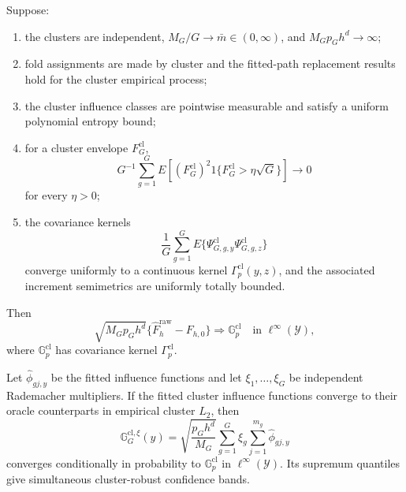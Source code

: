 \begin{proposition}
\label{prop:cluster-bootstrap}
Suppose:

\begin{enumerate}[leftmargin=1.6em]
\item the clusters are independent, \(M_G/G\to\bar m\in(0,\infty)\), and \(M_Gp_Gh^d\to\infty\);
\item fold assignments are made by cluster and the fitted-path replacement results hold for the cluster empirical process;
\item the cluster influence classes are pointwise measurable and satisfy a uniform polynomial entropy bound;
\item for a cluster envelope \(F_G^{\mathrm{cl}}\),
   \[
   G^{-1}\sum_{g=1}^G
   E\left[
   (F_G^{\mathrm{cl}})^2
   1\{F_G^{\mathrm{cl}}>\eta\sqrt G\}
   \right]
   \to0
   \]
   for every \(\eta>0\);
\item the covariance kernels
   \[
   \frac1G\sum_{g=1}^G
   E\{\Psi_{G,g,y}^{\mathrm{cl}}
      \Psi_{G,g,z}^{\mathrm{cl}}\}
   \]
   converge uniformly to a continuous kernel \(\Gamma_p^{\mathrm{cl}}(y,z)\), and the associated increment semimetrics are uniformly totally bounded.
\end{enumerate}

Then
\begin{equation}
\sqrt{M_Gp_Gh^d}
\{\widehat F_h^{\mathrm{raw}}-F_{h,0}\}
\Rightarrow
\mathbb G_p^{\mathrm{cl}}
\quad\text{in }\ell^\infty(\mathcal Y),
\label{eq:cluster-process-limit}
\end{equation}
where \(\mathbb G_p^{\mathrm{cl}}\) has covariance kernel \(\Gamma_p^{\mathrm{cl}}\).

Let \(\widehat\phi_{gj,y}\) be the fitted influence functions and let \(\xi_1,\ldots,\xi_G\) be independent Rademacher multipliers. If the fitted cluster influence functions converge to their oracle counterparts in empirical cluster \(L_2\), then
\begin{equation}
\mathbb G_G^{\mathrm{cl},\xi}(y)
=
\sqrt{\frac{p_Gh^d}{M_G}}
\sum_{g=1}^G\xi_g
\sum_{j=1}^{m_g}\widehat\phi_{gj,y}
\label{eq:cluster-multiplier}
\end{equation}
converges conditionally in probability to \(\mathbb G_p^{\mathrm{cl}}\) in \(\ell^\infty(\mathcal Y)\). Its supremum quantiles give simultaneous cluster-robust confidence bands.
\end{proposition}

